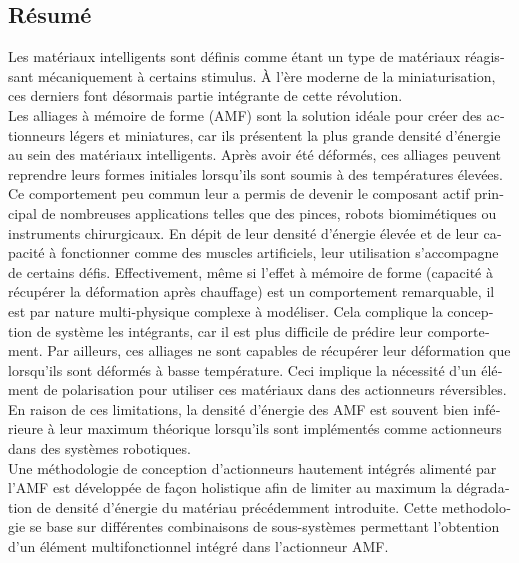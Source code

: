 \begin{otherlanguage}{french}
\cleardoublepage
\chapter*{Résumé}

Les matériaux intelligents sont définis comme étant un type de matériaux réagissant mécaniquement à certains stimulus. À l’ère moderne de la miniaturisation, ces derniers font désormais partie intégrante de cette révolution.\\

Les alliages à mémoire de forme (AMF) sont la solution idéale pour créer des actionneurs légers et miniatures, car ils présentent la plus grande densité d’énergie au sein des matériaux intelligents. Après avoir été déformés, ces alliages peuvent reprendre leurs formes initiales lorsqu’ils sont soumis à des températures élevées. Ce comportement peu commun leur a permis de devenir le composant actif principal de nombreuses applications telles que des pinces, robots biomimétiques ou instruments chirurgicaux.
En dépit de leur densité d’énergie élevée et de leur capacité à fonctionner comme des muscles artificiels, leur utilisation s’accompagne de certains défis. Effectivement, même si l’effet à mémoire de forme (capacité à récupérer la déformation après chauffage) est un comportement remarquable, il est par nature multi-physique complexe à modéliser. Cela complique la conception de système les intégrants, car il est plus difficile de prédire leur comportement. Par ailleurs, ces alliages ne sont capables de récupérer leur déformation que lorsqu’ils sont déformés à basse température. Ceci implique la nécessité d’un élément de polarisation pour utiliser ces matériaux dans des actionneurs réversibles. En raison de ces limitations, la densité d’énergie des AMF est souvent bien inférieure à leur maximum théorique lorsqu’ils sont implémentés comme actionneurs dans des systèmes robotiques.\\

Une méthodologie de conception d’actionneurs hautement intégrés alimenté par l’AMF est développée de façon holistique afin de limiter au maximum la dégradation de densité d’énergie du matériau précédemment introduite. Cette methodologie se base sur différentes combinaisons de sous-systèmes permettant l’obtention d’un élément multifonctionnel intégré dans l’actionneur AMF.\\


\end{otherlanguage}
